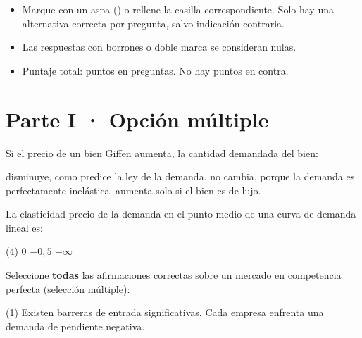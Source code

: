 \documentclass{evaluacion}
\begin{document}
\membrete

\begin{instrucciones}
\begin{itemize}
  \item Marque con un aspa (\texttimes) o rellene la casilla correspondiente.
        Solo hay una alternativa correcta por pregunta, salvo indicación
        contraria.
  \item Las respuestas con borrones o doble marca se consideran nulas.
  \item Puntaje total: \totalpuntos{} puntos en \totalpreguntas{} preguntas.
        No hay puntos en contra.
\end{itemize}
\end{instrucciones}

\section*{\color{colorprimario}Parte I · Opción múltiple}

\begin{pregunta}[2]
Si el precio de un bien Giffen aumenta, la cantidad demandada del bien:
\begin{opciones}
  \opcion disminuye, como predice la ley de la demanda.
  \opcion {}
  \opcion no cambia, porque la demanda es perfectamente inelástica.
  \opcion aumenta solo si el bien es de lujo.
\end{opciones}
\end{pregunta}

\begin{pregunta}[2]
La elasticidad precio de la demanda en el punto medio de una curva de
demanda lineal es:
\begin{opciones}(4)
  \opcion $0$
  \opcion $-0{,}5$
  \opcion {}
  \opcion $-\infty$
\end{opciones}
\end{pregunta}

\begin{pregunta}[2]
Seleccione \textbf{todas} las afirmaciones correctas sobre un mercado en
competencia perfecta (selección múltiple):
\begin{opciones}(1)
  \opcion {}
  \opcion Existen barreras de entrada significativas.
  \opcion {}
  \opcion Cada empresa enfrenta una demanda de pendiente negativa.
\end{opciones}
\end{pregunta}
\end{document}
